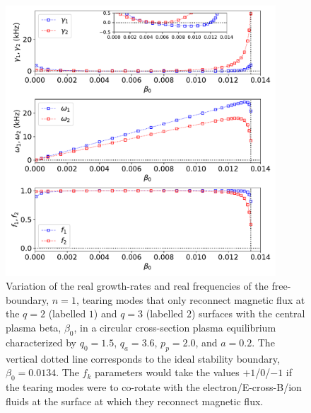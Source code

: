 \documentclass[12pt,prb,aps]{revtex4-1}
\begin{document}
\begin{figure}
\centerline{\includegraphics[width=0.9\textwidth]{Fig7.pdf}}
\caption{Variation of the real growth-rates and real frequencies of the free-boundary, $n=1$, tearing modes that only reconnect magnetic flux at the  $q=2$ (labelled $1$) and $q=3$ (labelled $2$)  surfaces with the central plasma beta, $\beta_0$, in a circular cross-section plasma equilibrium characterized by $q_0=1.5$, $q_a= 3.6$, $p_p=2.0$, and
$a=0.2$. The vertical dotted line corresponds to the ideal stability boundary, $\beta_0=0.0134$. The $f_k$ parameters would take the values $+1$/0/$-1$ if the tearing modes were to co-rotate with the
electron/E-cross-B/ion fluids at the surface at which they reconnect magnetic flux.\label{fig7}}
\end{figure}
\end{document}
